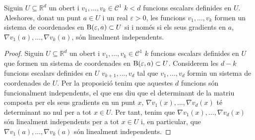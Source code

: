 \documentclass[../Apunts.tex]{subfiles}
\begin{document}
	\begin{theorem}\label{thm:sistema de coordenades en un entorn iff gradients linealment independents}
		Siguin \(U\subseteq\mathbb{R}^{d}\) un obert i \(v_{1},\dots,v_{k}\in\mathcal{C}^{1}\) \(k<d\) funcions escalars definides en \(U\). Aleshores, donat un punt \(a\in U\) i un real \(\varepsilon>0\), les funcions \(v_{1},\dots,v_{k}\) formen un sistema de coordenades en \(\operatorname{B}(\varepsilon,a)\subset U\) si i només si els seus gradients en \(a\), \(\nabla v_{1}(a),\dots,\nabla v_{k}(a)\), són linealment independents.
		\begin{proof}
			Siguin \(U\subseteq\mathbb{R}^{d}\) un obert i \(v_{1},\dots,v_{k}\in\mathcal{C}^{1}\) \(k\) funcions escalars definides en \(U\) que formen un sistema de coordenades en \(\operatorname{B}(\varepsilon,a)\subset U\). Considerem les \(d-k\) funcions escalars definides en \(U\) \(v_{k+1},\dots,v_{d}\) tal que \(v_{1},\dots,v_{d}\) formin un sistema de coordenades de \(U\). Per la proposició  tenim que aquestes \(d\) funcions són funcionalment independents, el que ens diu que el determinant de la matriu composta per els seus gradients en un punt \(x\), \(\nabla v_{1}(x),\dots,\nabla v_{d}(x)\) té determinant no nul per a tot \(x\in U\). Per tant, tenim que \(\nabla v_{1}(x),\dots,\nabla v_{d}(x)\) són linealment independents per a tot \(x\in U\) i, en particular, que \(\nabla v_{1}(a),\dots,\nabla v_{k}(a)\) són linealment independents. %
		\end{proof}
	\end{theorem}
\end{document}
